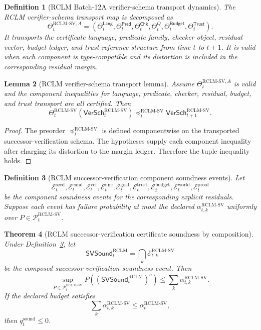 \documentclass[11pt,a4paper]{article}
\newtheorem{theorem}{Theorem}[section]
\newtheorem{lemma}[theorem]{Lemma}
\newtheorem{definition}[theorem]{Definition}
\newcommand{\Pcal}{\mathcal P}
\newcommand{\Ecal}{\mathcal E}
\newcommand{\RCLM}{\mathrm{RCLM}}
\begin{document}
\begin{definition}[RCLM Batch-12A verifier-schema transport dynamics]
\label{def:rclm-batch12a-verifier-schema-transport}
The RCLM verifier-schema transport map is decomposed as
\[
\Theta_t^{\RCLM\text{-}\mathrm{SV},A}
=
(\Theta_t^{\mathsf{Lang}},
\Theta_t^{\mathsf{Pred}},
\Theta_t^{\mathsf{Chk}},
\Theta_t^{Q},
\Theta_t^{\mathsf{Budget}},
\Theta_t^{\mathsf{Trust}}).
\]
It transports the certificate language, predicate family, checker object, residual vector, budget ledger, and trust-reference structure from time \(t\) to \(t+1\).  It is valid when each component is type-compatible and its distortion is included in the corresponding residual margin.
\end{definition}

\begin{lemma}[RCLM verifier-schema transport lemma]
\label{lem:rclm-batch12a-verifier-schema-transport}
Assume \(\Theta_t^{\RCLM\text{-}\mathrm{SV},A}\) is valid and the component inequalities for language, predicate, checker, residual, budget, and trust transport are all certified. Then
\[
\Theta_t^{\RCLM\text{-}\mathrm{SV}}(\mathsf{VerSch}_t^{\RCLM\text{-}\mathrm{SV}})
\preceq_t^{\RCLM\text{-}\mathrm{SV}}
\mathsf{VerSch}_{t+1}^{\RCLM\text{-}\mathrm{SV}}.
\]
\end{lemma}

\begin{proof}
The preorder \(\preceq_t^{\RCLM\text{-}\mathrm{SV}}\) is defined componentwise on the transported successor-verification schema. The hypotheses supply each component inequality after charging its distortion to the margin ledger. Therefore the tuple inequality holds.
\end{proof}

\begin{definition}[RCLM successor-verification component soundness events]
\label{def:rclm-batch12a-sv-component-soundness-events}
Let
\[
\Ecal_t^{\mathrm{seed}},
\Ecal_t^{\mathrm{cand}},
\Ecal_t^{\mathrm{ver}},
\Ecal_t^{\mathrm{unc}},
\Ecal_t^{\mathrm{goal}},
\Ecal_t^{\mathrm{trust}},
\Ecal_t^{\mathrm{budget}},
\Ecal_t^{\mathrm{world}},
\Ecal_t^{\mathrm{proof}}
\]
be the component soundness events for the corresponding explicit residuals. Suppose each event has failure probability at most the declared \(\alpha_{t,k}^{\RCLM\text{-}\mathrm{SV}}\) uniformly over \(P\in\Pcal_t^{\RCLM\text{-}\mathrm{SV}}\).
\end{definition}

\begin{theorem}[RCLM successor-verification certificate soundness by composition]
\label{thm:rclm-batch12a-sv-soundness-composition}
Under Definition~\ref{def:rclm-batch12a-sv-component-soundness-events}, let
\[
\mathsf{SVSound}_t^{\RCLM}
=
\bigcap_k \Ecal_{t,k}^{\RCLM\text{-}\mathrm{SV}}
\]
be the composed successor-verification soundness event. Then
\[
\sup_{P\in\Pcal_t^{\RCLM\text{-}\mathrm{SV}}}
P((\mathsf{SVSound}_t^{\RCLM})^c)
\le
\sum_k \alpha_{t,k}^{\RCLM\text{-}\mathrm{SV}}.
\]
If the declared budget satisfies
\[
\sum_k \alpha_{t,k}^{\RCLM\text{-}\mathrm{SV}}
\le
\alpha_t^{\RCLM\text{-}\mathrm{SV}},
\]
then \(q_t^{\mathrm{sound}}\le0\).
\end{theorem}
\end{document}
